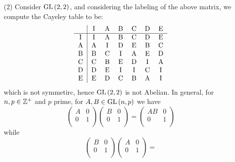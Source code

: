 \begin{example}
\begin{enumerate}
    \item[(2)] Consider $\operatorname{GL}{(2,2)}$, and considering the labeling of the
      above  matrix, we compute the Cayeley table to be:
      \begin{equation*}
        \begin{tabular}{c | c c c c c c}
      & I   &   A   &   B   &   C   &   D   &   E   \\
      \hline
          I & I & A & B & C & D & E \\
          A & A & I & D & E & B & C \\
          B & B & C & I & A & E & D \\
          C & C & B & E & D & I & A \\
          D & D & E & I & I & C & I \\
          E & E & D &C  & B & A & I \\
        \end{tabular}
      \end{equation*}
      which is not symmetirc, hence $\operatorname{GL}{(2,2)}$ is not Abelian. In general, for $n,
      p \in \mathbb{Z}^+$ and $p$ prime, for  $A,B \in \operatorname{GL}{(n,p)}$ we have
      \begin{equation*}
        \begin{pmatrix}
          A   &   0   \\
          0   &   1   \\
        \end{pmatrix}
        \begin{pmatrix}
          B   &   0   \\
          0   &   1   \\
        \end{pmatrix}=
        \begin{pmatrix}
          AB  &   0   \\
          0   &   1   \\
        \end{pmatrix}
      \end{equation*}
      while
      \begin{equation*}
        \begin{pmatrix}
          B   &   0   \\
          0   &   1   \\
        \end{pmatrix}
        \begin{pmatrix}
          A   &   0   \\
          0   &   1   \\
        \end{pmatrix}=

\end{equation*}
\end{enumerate}
\end{example}
